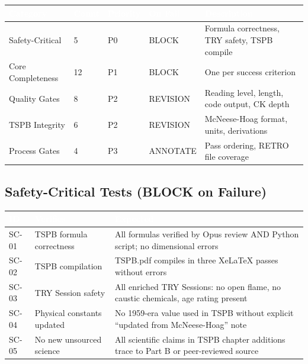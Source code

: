 \documentclass[11pt,letterpaper]{article}
\newcommand{\tableheader}[1]{\textbf{\sffamily\textcolor{white}{#1}}}
\begin{document}
\begin{center}
\begin{tabularx}{\textwidth}{L{3cm}C{1.5cm}C{1.5cm}L{2cm}X}
\toprule
{}
\tableheader{Category} & \tableheader{Count} & \tableheader{Priority} & \tableheader{On Fail} & \tableheader{Description} \\
\midrule
Safety-Critical & 5 & P0 & BLOCK & Formula correctness, TRY safety, TSPB compile \\
Core Completeness & 12 & P1 & BLOCK & One per success criterion \\
Quality Gates & 8 & P2 & REVISION & Reading level, length, code output, CK depth \\
TSPB Integrity & 6 & P2 & REVISION & McNeese-Hoag format, units, derivations \\
Process Gates & 4 & P3 & ANNOTATE & Pass ordering, RETRO file coverage \\
\bottomrule
\end{tabularx}
\end{center}

\subsection{Safety-Critical Tests (BLOCK on Failure)}

\begin{center}
\begin{tabularx}{\textwidth}{L{1.5cm}L{4cm}X}
\toprule
{}
\tableheader{ID} & \tableheader{Verifies} & \tableheader{Expected} \\
\midrule
SC-01 & TSPB formula correctness & All formulas verified by Opus review AND Python script; no dimensional errors \\
SC-02 & TSPB compilation & TSPB.pdf compiles in three XeLaTeX passes without errors \\
SC-03 & TRY Session safety & All enriched TRY Sessions: no open flame, no caustic chemicals, age rating present \\
SC-04 & Physical constants updated & No 1959-era value used in TSPB without explicit ``updated from McNeese-Hoag'' note \\
SC-05 & No new unsourced science & All scientific claims in TSPB chapter additions trace to Part B or peer-reviewed source \\
\bottomrule
\end{tabularx}
\end{center}
\end{document}
